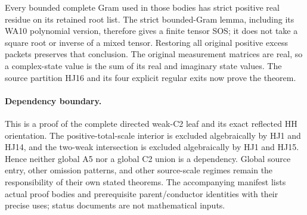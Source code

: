 Every bounded complete Gram used in those bodies
has strict positive real residue on its retained
root list.  The strict bounded-Gram lemma, including
its WA10 polynomial version, therefore
gives a finite tensor SOS; it does not take a
square root or inverse of a mixed tensor.
Restoring all original positive excess packets
preserves that conclusion.
The original measurement matrices are real, so a
complex-state value is the sum of its real and
imaginary state values.
The source partition HJ16 and its four explicit
regular exits now prove the theorem.

\paragraph{Dependency boundary.}
This is a proof of the complete directed weak-C2
leaf and its exact reflected HH orientation.
The positive-total-scale interior is excluded
algebraically by HJ1 and HJ14, and the two-weak
intersection is excluded algebraically by HJ1
and HJ15.  Hence neither global A5 nor a global
C2 union is a dependency.
Global source entry, other omission patterns,
and other source-scale regimes remain the
responsibility of their own stated theorems.
The accompanying manifest lists actual proof
bodies and prerequisite parent/conductor
identities with their precise uses; status
documents are not mathematical inputs.
